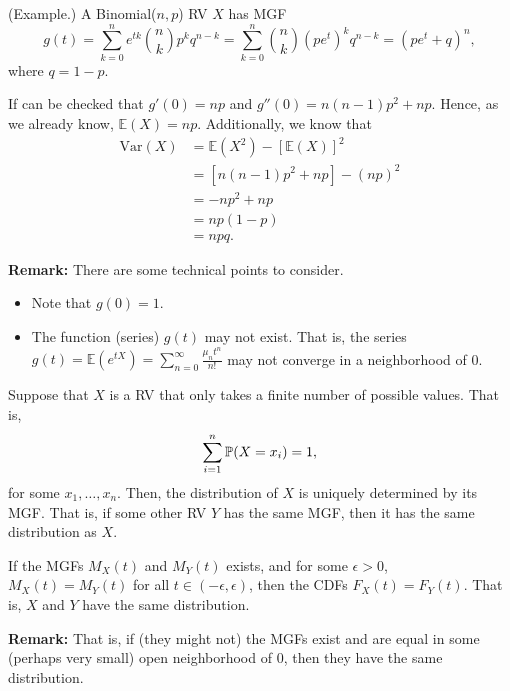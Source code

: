 \documentclass[letterpaper]{article}
\begin{document}
\begin{mdframed}[]
    (Example.) A Binomial($n, p$) RV $X$ has MGF 
    \[g(t) = \sum_{k = 0}^{n} e^{tk} \binom{n}{k} p^k q^{n - k} = \sum_{k = 0}^{n} \binom{n}{k} (pe^t)^k q^{n - k} = (pe^t + q)^n,\]
    where $q = 1 - p$.

    \bigskip 

    If can be checked that $g'(0) = np$ and $g''(0) = n(n - 1)p^2 + np$. Hence, as we already know, $\mathbb{E}(X) = np$. Additionally, we know that 
    \begin{equation*}
        \begin{aligned}
            \text{Var}(X) &= \mathbb{E}(X^2) - [\mathbb{E}(X)]^2 \\ 
                &= [n(n - 1)p^2 + np] - (np)^2 \\ 
                &= -np^2 + np \\ 
                &= np(1 - p) \\ 
                &= npq.
        \end{aligned}
    \end{equation*}
\end{mdframed}
\textbf{Remark:} There are some technical points to consider.
\begin{itemize}
    \item Note that $g(0) = 1$. 
    \item The function (series) $g(t)$ may not exist. That is, the series $g(t) = \mathbb{E}(e^{tX}) = \sum_{n = 0}^{\infty} \frac{\mu_n t^n}{n!}$ may not converge in a neighborhood of 0. 
\end{itemize}

\begin{theorem}{}{}
    Suppose that $X$ is a RV that only takes a finite number of possible values. That is, \[\sum_{i = 1}^{n} \mathbb{P}(X = x_i) = 1,\] for some $x_1, \dots, x_n$. Then, the distribution of $X$ is uniquely determined by its MGF. That is, if some other RV $Y$ has the same MGF, then it has the same distribution as $X$. 
\end{theorem}

\begin{theorem}{}{}
    If the MGFs $M_{X}(t)$ and $M_{Y}(t)$ exists, and for some $\epsilon > 0$, $M_{X}(t) = M_{Y}(t)$ for all $t \in (-\epsilon, \epsilon)$, then the CDFs $F_{X}(t) = F_{Y}(t)$. That is, $X$ and $Y$ have the same distribution.
\end{theorem}
\textbf{Remark:} That is, if (they might not) the MGFs exist and are equal in some (perhaps very small) open neighborhood of 0, then they have the same distribution.
\end{document}
